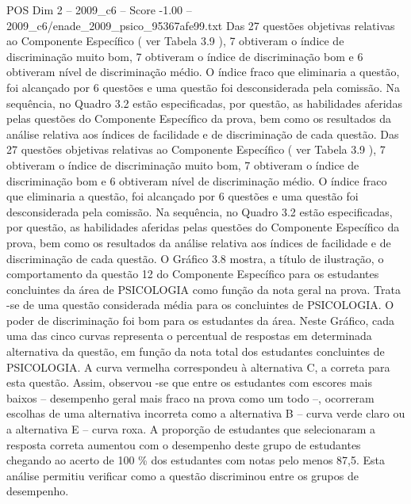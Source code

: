 \begin{textsample}{POS Dim 2 – 2009\_c6 – Score -1.00 – 2009\_c6/enade\_2009\_psico\_95367afe99.txt}
Das 27 questões objetivas relativas ao Componente Específico ( ver Tabela 3.9 ), 7 obtiveram o índice de discriminação muito bom, 7 obtiveram o índice de discriminação bom e 6 obtiveram nível de discriminação médio.
O índice fraco que eliminaria a questão, foi alcançado por 6 questões e uma questão foi desconsiderada pela comissão.
Na sequência, no Quadro 3.2 estão especificadas, por questão, as habilidades aferidas pelas questões do Componente Específico da prova, bem como os resultados da análise relativa aos índices de facilidade e de discriminação de cada questão.
Das 27 questões objetivas relativas ao Componente Específico ( ver Tabela 3.9 ), 7 obtiveram o índice de discriminação muito bom, 7 obtiveram o índice de discriminação bom e 6 obtiveram nível de discriminação médio.
O índice fraco que eliminaria a questão, foi alcançado por 6 questões e uma questão foi desconsiderada pela comissão.
Na sequência, no Quadro 3.2 estão especificadas, por questão, as habilidades aferidas pelas questões do Componente Específico da prova, bem como os resultados da análise relativa aos índices de facilidade e de discriminação de cada questão.
O Gráfico 3.8 mostra, a título de ilustração, o comportamento da questão 12 do Componente Específico para os estudantes concluintes da área de PSICOLOGIA como função da nota geral na prova.
Trata -se de uma questão considerada média para os concluintes de PSICOLOGIA.
O poder de discriminação foi bom para os estudantes da área.
Neste Gráfico, cada uma das cinco curvas representa o percentual de respostas em determinada alternativa da questão, em função da nota total dos estudantes concluintes de PSICOLOGIA.
A curva vermelha correspondeu à alternativa C, a correta para esta questão.
Assim, observou -se que entre os estudantes com escores mais baixos – desempenho geral mais fraco na prova como um todo –, ocorreram escolhas de uma alternativa incorreta como a alternativa B – curva verde claro ou a alternativa E – curva roxa.
A proporção de estudantes que selecionaram a resposta correta aumentou com o desempenho deste grupo de estudantes chegando ao acerto de 100 \% dos estudantes com notas pelo menos 87,5.
Esta análise permitiu verificar como a questão discriminou entre os grupos de desempenho.

\end{textsample}
